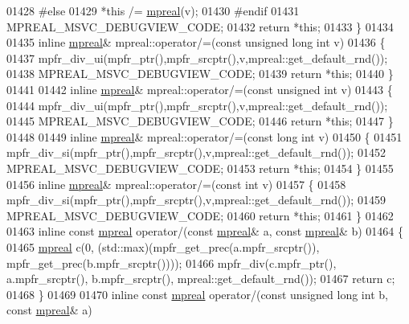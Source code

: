 \begin{DoxyCode}
01428 \textcolor{preprocessor}{#else}
01429     *\textcolor{keyword}{this} /= \hyperlink{classmpfr_1_1mpreal}{mpreal}(v);
01430 \textcolor{preprocessor}{#endif}
01431     MPREAL\_MSVC\_DEBUGVIEW\_CODE;
01432     \textcolor{keywordflow}{return} *\textcolor{keyword}{this};
01433 \}
01434 
01435 \textcolor{keyword}{inline} \hyperlink{classmpfr_1_1mpreal}{mpreal}& mpreal::operator/=(\textcolor{keyword}{const} \textcolor{keywordtype}{unsigned} \textcolor{keywordtype}{long} \textcolor{keywordtype}{int} v)
01436 \{
01437     mpfr\_div\_ui(mpfr\_ptr(),mpfr\_srcptr(),v,mpreal::get\_default\_rnd());
01438     MPREAL\_MSVC\_DEBUGVIEW\_CODE;
01439     \textcolor{keywordflow}{return} *\textcolor{keyword}{this};
01440 \}
01441 
01442 \textcolor{keyword}{inline} \hyperlink{classmpfr_1_1mpreal}{mpreal}& mpreal::operator/=(\textcolor{keyword}{const} \textcolor{keywordtype}{unsigned} \textcolor{keywordtype}{int} v)
01443 \{
01444     mpfr\_div\_ui(mpfr\_ptr(),mpfr\_srcptr(),v,mpreal::get\_default\_rnd());
01445     MPREAL\_MSVC\_DEBUGVIEW\_CODE;
01446     \textcolor{keywordflow}{return} *\textcolor{keyword}{this};
01447 \}
01448 
01449 \textcolor{keyword}{inline} \hyperlink{classmpfr_1_1mpreal}{mpreal}& mpreal::operator/=(\textcolor{keyword}{const} \textcolor{keywordtype}{long} \textcolor{keywordtype}{int} v)
01450 \{
01451     mpfr\_div\_si(mpfr\_ptr(),mpfr\_srcptr(),v,mpreal::get\_default\_rnd());
01452     MPREAL\_MSVC\_DEBUGVIEW\_CODE;
01453     \textcolor{keywordflow}{return} *\textcolor{keyword}{this};
01454 \}
01455 
01456 \textcolor{keyword}{inline} \hyperlink{classmpfr_1_1mpreal}{mpreal}& mpreal::operator/=(\textcolor{keyword}{const} \textcolor{keywordtype}{int} v)
01457 \{
01458     mpfr\_div\_si(mpfr\_ptr(),mpfr\_srcptr(),v,mpreal::get\_default\_rnd());
01459     MPREAL\_MSVC\_DEBUGVIEW\_CODE;
01460     \textcolor{keywordflow}{return} *\textcolor{keyword}{this};
01461 \}
01462 
01463 \textcolor{keyword}{inline} \textcolor{keyword}{const} \hyperlink{classmpfr_1_1mpreal}{mpreal} operator/(\textcolor{keyword}{const} \hyperlink{classmpfr_1_1mpreal}{mpreal}& a, \textcolor{keyword}{const} \hyperlink{classmpfr_1_1mpreal}{mpreal}& b)
01464 \{
01465   \hyperlink{classmpfr_1_1mpreal}{mpreal} c(0, (std::max)(mpfr\_get\_prec(a.mpfr\_srcptr()), mpfr\_get\_prec(b.mpfr\_srcptr())));
01466   mpfr\_div(c.mpfr\_ptr(), a.mpfr\_srcptr(), b.mpfr\_srcptr(), mpreal::get\_default\_rnd());
01467   \textcolor{keywordflow}{return} c;
01468 \}
01469 
01470 \textcolor{keyword}{inline} \textcolor{keyword}{const} \hyperlink{classmpfr_1_1mpreal}{mpreal} operator/(\textcolor{keyword}{const} \textcolor{keywordtype}{unsigned} \textcolor{keywordtype}{long} \textcolor{keywordtype}{int} b, \textcolor{keyword}{const} \hyperlink{classmpfr_1_1mpreal}{mpreal}& a)

\end{DoxyCode}

